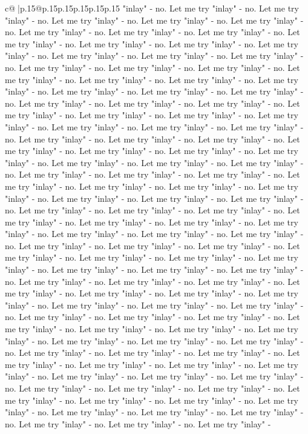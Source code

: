 \documentclass{article}
\begin{document}
{\begin{supertabular}{c@{$\;$}|p{.15\linewidth}@{}p{.15\linewidth}p{.15\linewidth}p{.15\linewidth}p{.15\linewidth}p{.15\linewidth}}
{{{"inlay" {-} no. Let me try "inlay" {-} no. Let me try "inlay" {-} no. Let me try "inlay" {-} no. Let me try "inlay" {-} no. Let me try "inlay" {-} no. Let me try "inlay" {-} no. Let me try "inlay" {-} no. Let me try "inlay" {-} no. Let me try "inlay" {-} no. Let me try "inlay" {-} no. Let me try "inlay" {-} no. Let me try "inlay" {-} no. Let me try "inlay" {-} no. Let me try "inlay" {-} no. Let me try "inlay" {-} no. Let me try "inlay" {-} no. Let me try "inlay" {-} no. Let me try "inlay" {-} no. Let me try "inlay" {-} no. Let me try "inlay" {-} no. Let me try "inlay" {-} no. Let me try "inlay" {-} no. Let me try "inlay" {-} no. Let me try "inlay" {-} no. Let me try "inlay" {-} no. Let me try "inlay" {-} no. Let me try "inlay" {-} no. Let me try "inlay" {-} no. Let me try "inlay" {-} no. Let me try "inlay" {-} no. Let me try "inlay" {-} no. Let me try "inlay" {-} no. Let me try "inlay" {-} no. Let me try "inlay" {-} no. Let me try "inlay" {-} no. Let me try "inlay" {-} no. Let me try "inlay" {-} no. Let me try "inlay" {-} no. Let me try "inlay" {-} no. Let me try "inlay" {-} no. Let me try "inlay" {-} no. Let me try "inlay" {-} no. Let me try "inlay" {-} no. Let me try "inlay" {-} no. Let me try "inlay" {-} no. Let me try "inlay" {-} no. Let me try "inlay" {-} no. Let me try "inlay" {-} no. Let me try "inlay" {-} no. Let me try "inlay" {-} no. Let me try "inlay" {-} no. Let me try "inlay" {-} no. Let me try "inlay" {-} no. Let me try "inlay" {-} no. Let me try "inlay" {-} no. Let me try "inlay" {-} no. Let me try "inlay" {-} no. Let me try "inlay" {-} no. Let me try "inlay" {-} no. Let me try "inlay" {-} no. Let me try "inlay" {-} no. Let me try "inlay" {-} no. Let me try "inlay" {-} no. Let me try "inlay" {-} no. Let me try "inlay" {-} no. Let me try "inlay" {-} no. Let me try "inlay" {-} no. Let me try "inlay" {-} no. Let me try "inlay" {-} no. Let me try "inlay" {-} no. Let me try "inlay" {-} no. Let me try "inlay" {-} no. Let me try "inlay" {-} no. Let me try "inlay" {-} no. Let me try "inlay" {-} no. Let me try "inlay" {-} no. Let me try "inlay" {-} no. Let me try "inlay" {-} no. Let me try "inlay" {-} no. Let me try "inlay" {-} no. Let me try "inlay" {-} no. Let me try "inlay" {-} no. Let me try "inlay" {-} no. Let me try "inlay" {-} no. Let me try "inlay" {-} no. Let me try "inlay" {-} no. Let me try "inlay" {-} no. Let me try "inlay" {-} no. Let me try "inlay" {-} no. Let me try "inlay" {-} no. Let me try "inlay" {-} no. Let me try "inlay" {-} no. Let me try "inlay" {-} no. Let me try "inlay" {-} no. Let me try "inlay" {-} no. Let me try "inlay" {-} no. Let me try "inlay" {-} no. Let me try "inlay" {-} no. Let me try "inlay" {-} no. Let me try "inlay" {-} no. Let me try "inlay" {-} no. Let me try "inlay" {-} no. Let me try "inlay" {-} no. Let me try "inlay" {-} no. Let me try "inlay" {-} no. Let me try "inlay" {-} no. Let me try "inlay" {-} no. Let me try "inlay" {-} no. Let me try "inlay" {-} no. Let me try "inlay" {-} no. Let me try "inlay" {-} no. Let me try "inlay" {-} no. Let me try "inlay" {-} no. Let me try "inlay" {-} no. Let me try "inlay" {-} no. Let me try "inlay" {-} no. Let me try "inlay" {-} no. Let me try "inlay" {-} }}}
\end{supertabular}}
\end{document}
